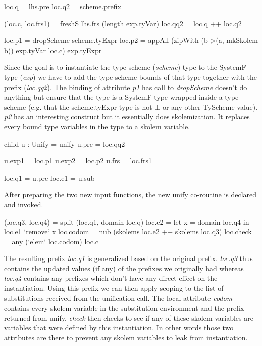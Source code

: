 \begin{code}
                      loc.q  = lhs.pre
                      loc.q2 = scheme.prefix
                      
                      (loc.c, loc.frs1) = freshS lhs.frs (length exp.tyVar)
                      loc.qq2 = loc.q ++ loc.q2
                      
                      loc.p1 = dropScheme scheme.tyExpr
                      loc.p2 = appAll (zipWith (\a b->(a, mkSkolem b)) exp.tyVar loc.c) exp.tyExpr
\end{code}
Since the goal is to instantiate the type scheme (\emph{scheme}) type to the SystemF type (\emph{exp}) we have to add the type scheme bounds of that type together with the prefix (\emph{loc.qq2}). 
The binding of attribute \emph{p1} has call to \emph{dropScheme} doesn't do anything but ensure that the type is a SystemF type wrapped inside a type scheme (e.g. that the scheme.tyExpr type is not $\bot$ or any other TyScheme value). \emph{p2} has an interesting construct but it essentially does skolemization. It replaces every bound type variables in the type to a skolem variable.

\begin{code}
                      child u : Unify = unify
                      u.pre  = loc.qq2
                      
                      u.exp1 = loc.p1
                      u.exp2 = loc.p2
                      u.frs  = loc.frs1
                      
                      loc.q1 = u.pre
                      loc.e1 = u.sub
\end{code}
After preparing the two new input functions, the new unify co-routine is declared and invoked.

\begin{code}
                      
                      (loc.q3, loc.q4) = split (loc.q1, domain loc.q)
                      loc.e2 = let x = domain loc.q4
                               in loc.e1 `remove` x
                      loc.codom = nub (skolems loc.e2 ++ skolems loc.q3)
                      loc.check = any (`elem` loc.codom) loc.c
\end{code}
The resulting prefix \emph{loc.q1} is generalized based on the original prefix. \emph{loc.q3} thus contains the updated values (if any) of the prefixes we originally had whereas \emph{loc.q4} contains any prefixes which don't have any direct effect on the instantiation. Using this prefix we can then apply scoping to the list of substitutions received from the unification call.
The local attribute \emph{codom} contains every skolem variable in the substitution environment and the prefix returned from unify. \emph{check} then checks to see if any of these skolem variables are variables that were defined by this instantiation. In other words those two attributes are there to prevent any skolem variables to leak from instantiation.

